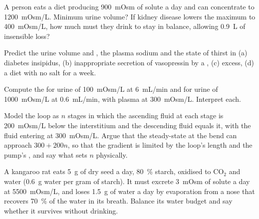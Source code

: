\begin{exercise}[$\star\star$]\label{exo:b3:renal-osmoregulation:7}
A person eats a diet producing \qty{900}{mOsm} of solute a day and can
concentrate to \qty{1200}{mOsm/L}. Minimum urine volume? If kidney
disease lowers the maximum to \qty{400}{mOsm/L}, how much must they
drink to stay in balance, allowing \qty{0.9}{L} of insensible loss?
\end{exercise}

\begin{exercise}[$\star\star$]\label{exo:b3:renal-osmoregulation:8}
Predict the urine volume and , the plasma sodium and the
state of thirst in (a) diabetes insipidus, (b) inappropriate secretion
of vasopressin by a , (c)  excess, (d) a diet with no
salt for a week.
\end{exercise}

\begin{exercise}[$\star\star$]\label{exo:b3:renal-osmoregulation:9}
Compute the  for urine of \qty{100}{mOsm/L} at
\qty{6}{mL/min} and for urine of \qty{1000}{mOsm/L} at
\qty{0.6}{mL/min}, with plasma at \qty{300}{mOsm/L}. Interpret each.
\end{exercise}

\begin{exercise}[$\star\star\star$]\label{exo:b3:renal-osmoregulation:10}
Model the loop as $n$ stages in which the ascending fluid at each
stage is \qty{200}{mOsm/L} below the interstitium and the descending
fluid equals it, with the fluid entering at \qty{300}{mOsm/L}. Argue
that the steady-state  at the bend can approach $300 +
200n$, so that the gradient is limited by the loop's length and the
pump's , and say what sets $n$ physically.
\end{exercise}

\begin{exercise}[$\star\star\star$]\label{exo:b3:renal-osmoregulation:11}
A kangaroo rat eats \qty{5}{g} of dry seed a day, \qty{80}{\%} starch,
oxidised to CO$_{2}$ and water (\qty{0.6}{g} water per gram of starch).
It must excrete \qty{3}{mOsm} of solute a day at \qty{5500}{mOsm/L},
and loses \qty{1.5}{g} of water a day by evaporation from a nose that
recovers \qty{70}{\%} of the water in its breath. Balance its water
budget and say whether it survives without drinking.
\end{exercise}

